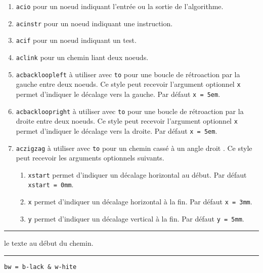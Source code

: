 \documentclass[12pt,a4paper]{article}
\theoremstyle{definition}
\newcommand\separation{
    \medskip
    \hfill\rule{0.5\textwidth}{0.75pt}\hfill
    \medskip
}
\newcommand\extraspace{
    \vspace{0.25em}
}
\newcommand\prefix[1]{%
    \texttt{#1}%
}
\begin{document}
\begin{enumerate}
	\item \verb#acio# pour un noeud indiquant l'entrée ou la sortie de l'algorithme.

	\item \verb#acinstr# pour un noeud indiquant une instruction.

	\item \verb#acif# pour un noeud indiquant un test.

	\smallskip

	\item \verb#aclink# pour un chemin liant deux noeuds.

	\smallskip

	\item \verb#acbackloopleft# à utiliser avec \verb#to# pour une boucle de rétroaction par la gauche entre deux noeuds.
	      Ce style peut recevoir l'argument optionnel \verb#x# permet d'indiquer le décalage vers la gauche.
		  Par défaut \verb#x = 5em#.

	\item \verb#acbackloopright# à utiliser avec \verb#to# pour une boucle de rétroaction par la droite entre deux noeuds.
	      Ce style peut recevoir l'argument optionnel \verb#x# permet d'indiquer le décalage vers la droite.
		  Par défaut \verb#x = 5em#.

	\smallskip

	\item \verb#aczigzag# à utiliser avec \verb#to# pour un chemin \fg cassé à un angle droit \fg.
	      Ce style peut recevoir les arguments optionnels suivants.
	      \begin{enumerate}
	      		\item \verb#xstart# permet d'indiquer un décalage horizontal au début.
			          Par défaut \verb#xstart = 0mm#.

	      		\item \verb#x# permet d'indiquer un décalage horizontal à la fin.
			          Par défaut \verb#x = 3mm#.

	      		\item \verb#y# permet d'indiquer un décalage vertical à la fin.
			          Par défaut \verb#y = 5mm#.
	      \end{enumerate}
\end{enumerate}




\separation




\extraspace




\IDarg{} le texte au début du chemin.




\separation


      \hfill  \prefix{bw = b-lack \& w-hite}

\end{document}
